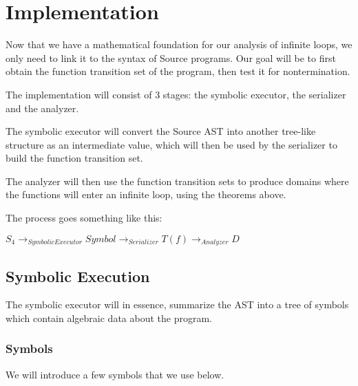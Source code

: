 \section{Implementation}

Now that we have a mathematical foundation for our analysis of infinite loops, we only need to link it to the syntax of Source programs.
Our goal will be to first obtain the function transition set of the program, then test it for nontermination.

The implementation will consist of 3 stages: the symbolic executor, the serializer and the analyzer.

The symbolic executor will convert the Source AST into another tree-like structure as an intermediate value, which will then be used by the serializer to build the function transition set.

The analyzer will then use the function transition sets to produce domains where the functions will enter an infinite loop, using the theorems above.

The process goes something like this:

$S_4 \to_{Symbolic Executor} Symbol \to_{Serializer} T(f) \to_{Analyzer} D $


\subsection{Symbolic Execution}

The symbolic executor will in essence, summarize the AST into a tree of symbols which contain algebraic data about the program.

\subsubsection{Symbols}
We will introduce a few symbols that we use below.


